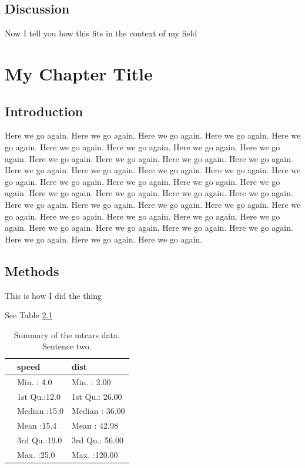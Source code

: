 \documentclass[
  10pt,
]{report}
\begin{document}
\hypertarget{discussion}{%
\section{Discussion}\label{discussion}}

Now I tell you how this fits in the context of my field

\hypertarget{my-chapter-title}{%
\chapter{My Chapter Title}\label{my-chapter-title}}

\hypertarget{introduction-1}{%
\section{Introduction}\label{introduction-1}}

Here we go again. Here we go again. Here we go again. Here we go again. Here we go again. Here we go again. Here we go again. Here we go again. Here we go again. Here we go again. Here we go again. Here we go again. Here we go again. Here we go again. Here we go again. Here we go again. Here we go again. Here we go again. Here we go again. Here we go again. Here we go again. Here we go again. Here we go again. Here we go again. Here we go again. Here we go again. Here we go again. Here we go again. Here we go again. Here we go again. Here we go again. Here we go again. Here we go again. Here we go again. Here we go again. Here we go again. Here we go again. Here we go again. Here we go again. Here we go again. Here we go again. Here we go again.

\hypertarget{methods-1}{%
\section{Methods}\label{methods-1}}

This is how I did the thing

See Table \ref{tab:testtable-3}

\begin{table}

\caption[Summary of the mtcars data.]{\label{tab:testtable-3}Summary of the mtcars data. Sentence two.}
\centering
\begin{tabular}[t]{l|l|l}
\hline
  &     speed &      dist\\
\hline
 & Min.   : 4.0 & Min.   :  2.00\\
\hline
 & 1st Qu.:12.0 & 1st Qu.: 26.00\\
\hline
 & Median :15.0 & Median : 36.00\\
\hline
 & Mean   :15.4 & Mean   : 42.98\\
\hline
 & 3rd Qu.:19.0 & 3rd Qu.: 56.00\\
\hline
 & Max.   :25.0 & Max.   :120.00\\
\hline
\end{tabular}
\end{table}
\end{document}
